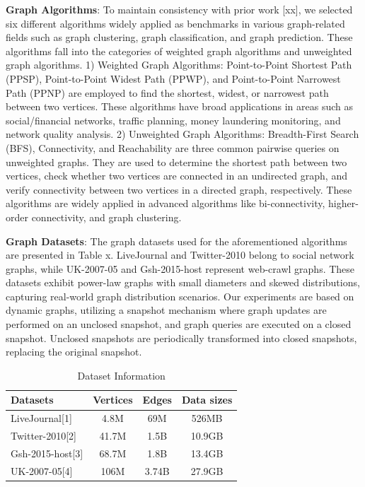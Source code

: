 \documentclass[lettersize,journal]{IEEEtran} %
\begin{document}
{\bf{Graph Algorithms}}: To maintain consistency with prior work [xx], we selected six different algorithms widely applied as benchmarks in various graph-related fields such as graph clustering, graph classification, and graph prediction. These algorithms fall into the categories of weighted graph algorithms and unweighted graph algorithms. 1) Weighted Graph Algorithms: Point-to-Point Shortest Path (PPSP), Point-to-Point Widest Path (PPWP), and Point-to-Point Narrowest Path (PPNP) are employed to find the shortest, widest, or narrowest path between two vertices. These algorithms have broad applications in areas such as social/financial networks, traffic planning, money laundering monitoring, and network quality analysis. 2) Unweighted Graph Algorithms: Breadth-First Search (BFS), Connectivity, and Reachability are three common pairwise queries on unweighted graphs. They are used to determine the shortest path between two vertices, check whether two vertices are connected in an undirected graph, and verify connectivity between two vertices in a directed graph, respectively. These algorithms are widely applied in advanced algorithms like bi-connectivity, higher-order connectivity, and graph clustering.

{\bf{Graph Datasets}}: The graph datasets used for the aforementioned algorithms are presented in Table x. LiveJournal and Twitter-2010 belong to social network graphs, while UK-2007-05 and Gsh-2015-host represent web-crawl graphs. These datasets exhibit power-law graphs with small diameters and skewed distributions, capturing real-world graph distribution scenarios. Our experiments are based on dynamic graphs, utilizing a snapshot mechanism where graph updates are performed on an unclosed snapshot, and graph queries are executed on a closed snapshot. Unclosed snapshots are periodically transformed into closed snapshots, replacing the original snapshot.

\begin{table}[h]
    \centering
    \begin{tabular}{lccc}
    \hline
    Datasets          & Vertices & Edges  & Data sizes \\
    \hline
    LiveJournal[1]    & 4.8M     & 69M    & 526MB      \\
    Twitter-2010[2]   & 41.7M    & 1.5B   & 10.9GB     \\
    Gsh-2015-host[3]  & 68.7M    & 1.8B   & 13.4GB     \\
    UK-2007-05[4]     & 106M     & 3.74B  & 27.9GB     \\
    \hline
    \end{tabular}
    \caption{Dataset Information}
    \end{table}
\end{document}

